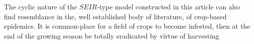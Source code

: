 
The cyclic nature of the $SEIR$-type model constructed in this article can also find resemblance in the, well established body of literature, of crop-based epidemics. It is common-place for a field of crops to become infested, then at the end of the growing season be totally eradicated by virtue of harvesting 







